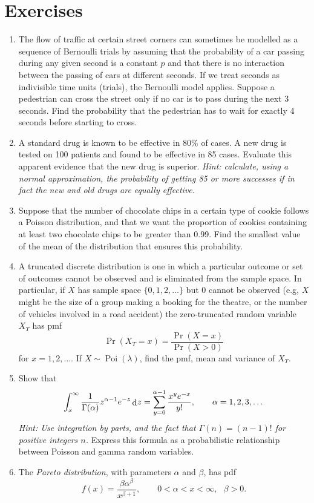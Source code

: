 \documentclass[
]{book}
\DeclareMathOperator{\Pois}{Poi}
\DeclareMathOperator{\dd}{d}
\newcommand{\dint}{\dd\hspace{0.5pt}\!}
\theoremstyle{definition}
\theoremstyle{definition}
\theoremstyle{definition}
\theoremstyle{definition}
\theoremstyle{remark}
\begin{document}
\hypertarget{exercises-1}{%
\section{Exercises}\label{exercises-1}}

\begin{enumerate}
\def\labelenumi{\arabic{enumi}.}
\item
  The flow of traffic at certain street corners can sometimes be modelled as a sequence of Bernoulli trials by assuming that the probability of a car passing during any given second is a constant \(p\) and that there is no interaction between the passing of cars at different seconds. If we treat seconds as indivisible time units (trials), the Bernoulli model applies. Suppose a pedestrian can cross the street only if no car is to pass during the next 3 seconds. Find the probability that the pedestrian has to wait for exactly 4 seconds before starting to cross.
\item
  A standard drug is known to be effective in 80\% of cases. A new drug is tested on 100 patients and found to be effective in 85 cases. Evaluate this apparent evidence that the new drug is superior. \emph{Hint: calculate, using a normal approximation, the probability of getting 85 or more successes if in fact the new and old drugs are equally effective.}
\item
  Suppose that the number of chocolate chips in a certain type of cookie follows a Poisson distribution, and that we want the proportion of cookies containing at least two chocolate chips to be greater than 0.99. Find the smallest value of the mean of the distribution that ensures this probability.
\item
  A truncated discrete distribution is one in which a particular outcome or set of outcomes cannot be observed and is eliminated from the sample space. In particular, if \(X\) has sample space \(\{0,1,2,\dots\}\) but \(0\) cannot be observed (e.g, \(X\) might be the size of a group making a booking for the theatre, or the number of vehicles involved in a road accident) the zero-truncated random variable \(X_T\) has pmf
  \[
    \Pr(X_T=x) = \frac{\Pr(X=x)}{\Pr(X>0)}
  \]
  for \(x=1,2,\dots\).
  If \(X\sim\Pois(\lambda)\), find the pmf, mean and variance of \(X_T\).
\item
  Show that
  \[
    \int_x^\infty {\frac{1}{\Gamma(\alpha)}} z^{\alpha-1}e^{-z} \dint z = \sum_{y=0}^{\alpha-1} \frac{x^ye^{-x}}{y!}, \hspace{2em} \alpha=1,2,3,\dots
  \]
  \emph{Hint: Use integration by parts, and the fact that \(\Gamma(n)=(n-1)!\) for positive integers \(n\).} Express this formula as a probabilistic relationship between Poisson and gamma random variables.
\item
  The \emph{Pareto distribution}, with parameters \(\alpha\) and \(\beta\), has pdf
  \[
   f(x) = \frac{\beta\alpha^\beta}{x^{\beta+1}}, \hspace{2em} 0<\alpha < x < \infty, \ \ \ \beta >0.
   \]


\end{enumerate}
\end{document}
